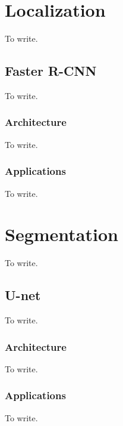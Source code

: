 \section{Localization}
To write.

\subsection{Faster R-CNN}
To write.

\subsubsection{Architecture}
To write.

\subsubsection{Applications}
To write.




\section{Segmentation}
To write.

\subsection{U-net}
To write.

\subsubsection{Architecture}
To write.

\subsubsection{Applications}
To write.

